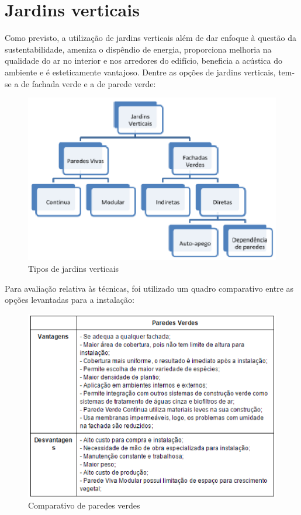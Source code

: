 \section{Jardins verticais}
Como previsto, a utilização de jardins verticais além de dar enfoque à questão da sustentabilidade, ameniza o dispêndio de energia, proporciona melhoria na qualidade do ar no interior e nos arredores do edifício, beneficia a acústica do ambiente e é esteticamente vantajoso. Dentre as opções de jardins verticais, tem-se a de fachada verde e a de parede verde:

\begin{figure}[!ht]
  \centering
  \includegraphics[keepaspectratio=true,scale=1]{figuras/jardimvertical.eps}
  \caption{Tipos de jardins verticais}
  \label{fig:tipos_jardins_verticais}
\end{figure}

Para avaliação relativa às técnicas, foi utilizado um quadro comparativo entre as opções levantadas para a instalação: 

\begin{figure}[!ht]
  \centering
  \includegraphics[keepaspectratio=true,scale=1]{figuras/comparativo_de_paredes_verdes.eps}
  \caption{Comparativo de paredes verdes}
  \label{fig:comparativo_paredes_verdes}
\end{figure}

